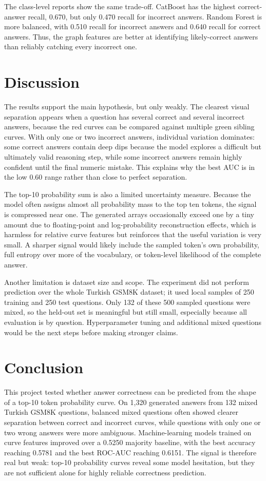 \documentclass[conference]{IEEEtran}
\begin{document}
The class-level reports show the same trade-off. CatBoost has the highest
correct-answer recall, 0.670, but only 0.470 recall for incorrect answers.
Random Forest is more balanced, with 0.510 recall for incorrect answers and
0.640 recall for correct answers. Thus, the graph features are better at
identifying likely-correct answers than reliably catching every incorrect one.

\section{Discussion}
The results support the main hypothesis, but only weakly. The clearest visual
separation appears when a question has several correct and several incorrect
answers, because the red curves can be compared against multiple green sibling
curves. With only one or two incorrect answers, individual variation dominates:
some correct answers contain deep dips because the model explores a difficult
but ultimately valid reasoning step, while some incorrect answers remain highly
confident until the final numeric mistake. This explains why the best AUC is in
the low 0.60 range rather than close to perfect separation.

The top-10 probability sum is also a limited uncertainty measure. Because the
model often assigns almost all probability mass to the top ten tokens, the
signal is compressed near one. The generated arrays occasionally exceed one by a
tiny amount due to floating-point and log-probability reconstruction effects,
which is harmless for relative curve features but reinforces that the useful
variation is very small. A sharper signal would likely include the sampled
token's own probability, full entropy over more of the vocabulary, or
token-level likelihood of the complete answer.

Another limitation is dataset size and scope. The experiment did not perform
prediction over the whole Turkish GSM8K dataset; it used local samples of 250
training and 250 test questions. Only 132 of these 500 sampled questions were
mixed, so the held-out set is meaningful but still small, especially because all
evaluation is by question. Hyperparameter tuning and additional mixed questions
would be the next steps before making stronger claims.

\section{Conclusion}
This project tested whether answer correctness can be predicted from the shape
of a top-10 token probability curve. On 1,320 generated answers from 132 mixed
Turkish GSM8K questions, balanced mixed questions often showed clearer
separation between correct and incorrect curves, while questions with only one
or two wrong answers were more ambiguous. Machine-learning models trained on
curve features improved over a 0.5250 majority baseline, with the best accuracy
reaching 0.5781 and the best ROC-AUC reaching 0.6151. The signal is therefore
real but weak: top-10 probability curves reveal some model hesitation, but they
are not sufficient alone for highly reliable correctness prediction.
\end{document}
